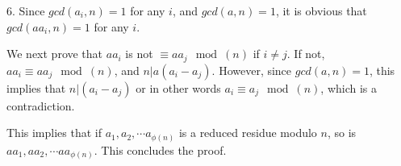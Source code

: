 \documentclass{article}
\begin{document}
6. Since $gcd(a_i, n) = 1$ for any $i$, and $gcd(a, n) = 1$, it is obvious that $gcd(aa_i, n) = 1$ for any $i$.

We next prove that $aa_i$ is not $\equiv aa_j \mod(n)$ if $i \ne j$. If not, $aa_i \equiv aa_j \mod(n)$, and $n | a(a_i - a_j)$. However, since $gcd(a, n) = 1$, this implies that $n | (a_i - a_j)$ or in other words $a_i \equiv a_j \mod(n)$, which is a contradiction.

This implies that if $a_1, a_2, \cdots a_{\phi(n)}$ is a reduced residue modulo $n$, so is $aa_1, aa_2, \cdots aa_{\phi(n)}$. This concludes the proof.
\end{document}
